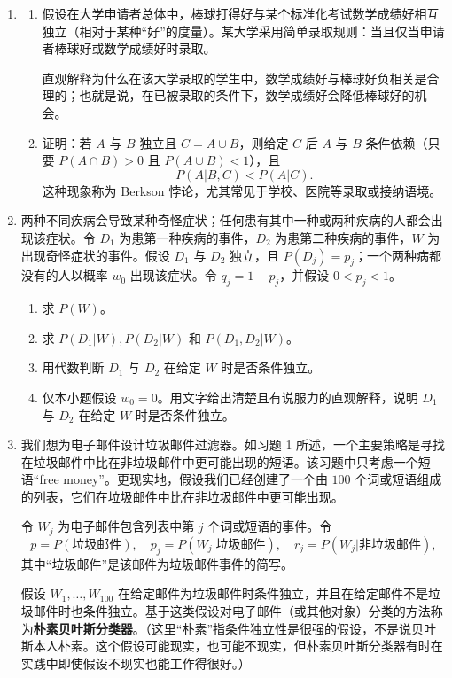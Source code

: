 \documentclass[UTF8, 12pt, fontset=fandol, oneside]{ctexart}
\begin{document}
\begin{enumerate}
  \item
  \begin{enumerate}
    \item 假设在大学申请者总体中，棒球打得好与某个标准化考试数学成绩好相互独立（相对于某种“好”的度量）。某大学采用简单录取规则：当且仅当申请者棒球好或数学成绩好时录取。

    直观解释为什么在该大学录取的学生中，数学成绩好与棒球好负相关是合理的；也就是说，在已被录取的条件下，数学成绩好会降低棒球好的机会。

    \item 证明：若 $A$ 与 $B$ 独立且 $C=A\cup B$，则给定 $C$ 后 $A$ 与 $B$ 条件依赖（只要 $P(A\cap B)>0$ 且 $P(A\cup B)<1$），且
    \[
      P(A|B,C)<P(A|C).
    \]
    这种现象称为 Berkson 悖论，尤其常见于学校、医院等录取或接纳语境。
  \end{enumerate}

  \item 两种不同疾病会导致某种奇怪症状；任何患有其中一种或两种疾病的人都会出现该症状。令 $D_1$ 为患第一种疾病的事件，$D_2$ 为患第二种疾病的事件，$W$ 为出现奇怪症状的事件。假设 $D_1$ 与 $D_2$ 独立，且 $P(D_j)=p_j$；一个两种病都没有的人以概率 $w_0$ 出现该症状。令 $q_j=1-p_j$，并假设 $0<p_j<1$。
  \begin{enumerate}
    \item 求 $P(W)$。
    \item 求 $P(D_1|W),P(D_2|W)$ 和 $P(D_1,D_2|W)$。
    \item 用代数判断 $D_1$ 与 $D_2$ 在给定 $W$ 时是否条件独立。
    \item 仅本小题假设 $w_0=0$。用文字给出清楚且有说服力的直观解释，说明 $D_1$ 与 $D_2$ 在给定 $W$ 时是否条件独立。
  \end{enumerate}

  \item 我们想为电子邮件设计垃圾邮件过滤器。如习题 1 所述，一个主要策略是寻找在垃圾邮件中比在非垃圾邮件中更可能出现的短语。该习题中只考虑一个短语“free money”。更现实地，假设我们已经创建了一个由 $100$ 个词或短语组成的列表，它们在垃圾邮件中比在非垃圾邮件中更可能出现。

  令 $W_j$ 为电子邮件包含列表中第 $j$ 个词或短语的事件。令
  \[
    p=P(\text{垃圾邮件}),\quad
    p_j=P(W_j|\text{垃圾邮件}),\quad
    r_j=P(W_j|\text{非垃圾邮件}),
  \]
  其中“垃圾邮件”是该邮件为垃圾邮件事件的简写。

  假设 $W_1,\ldots,W_{100}$ 在给定邮件为垃圾邮件时条件独立，并且在给定邮件不是垃圾邮件时也条件独立。基于这类假设对电子邮件（或其他对象）分类的方法称为\textbf{朴素贝叶斯分类器}。（这里“朴素”指条件独立性是很强的假设，不是说贝叶斯本人朴素。这个假设可能现实，也可能不现实，但朴素贝叶斯分类器有时在实践中即使假设不现实也能工作得很好。）


\end{enumerate}
\end{document}
